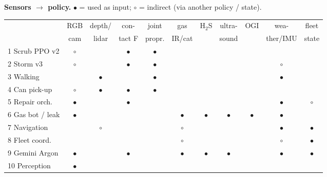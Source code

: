 \documentclass[8pt,a4paper]{extarticle}
\newcommand{\hd}[1]{\textbf{\textcolor{edge}{#1}}}
\begin{document}
\vspace{3pt}
\begin{multicols}{2}
\raggedcolumns
\hd{Sensors $\to$ policy.} $\bullet$ = used as input; $\circ$ = indirect (via another policy / state).\par\vspace{1pt}
{\scriptsize\setlength{\tabcolsep}{1.5pt}
\noindent\begin{tabular}{@{}lcccccccccc@{}}
\toprule
& RGB & depth/ & con- & joint & gas & H$_2$S & ultra- & OGI & wea- & fleet \\
& cam & lidar & tact F & propr. & IR/cat & & sound & & ther/IMU & state \\
\midrule
1 Scrub PPO v2     & $\circ$ & & $\bullet$ & $\bullet$ & & & & & & \\
2 Storm v3         & $\circ$ & & $\bullet$ & $\bullet$ & & & & & $\circ$ & \\
3 Walking          & & $\bullet$ & & $\bullet$ & & & & & $\bullet$ & \\
4 Can pick-up      & $\circ$ & $\bullet$ & $\bullet$ & $\bullet$ & & & & & & \\
5 Repair orch.     & $\bullet$ & & $\bullet$ & & & & & & $\bullet$ & $\circ$ \\
6 Gas bot / leak   & $\bullet$ & & & & $\bullet$ & $\bullet$ & $\bullet$ & $\bullet$ & $\bullet$ & \\
7 Navigation       & & $\circ$ & & & $\circ$ & & & & $\bullet$ & $\bullet$ \\
8 Fleet coord.     & & & & & $\circ$ & & & & $\circ$ & $\bullet$ \\
9 Gemini Argon     & $\bullet$ & & $\bullet$ & & $\bullet$ & $\bullet$ & $\bullet$ & & $\bullet$ & $\bullet$ \\
10 Perception      & $\bullet$ & & & & & & & & & \\
\bottomrule
\end{tabular}}


\end{multicols}
\end{document}

